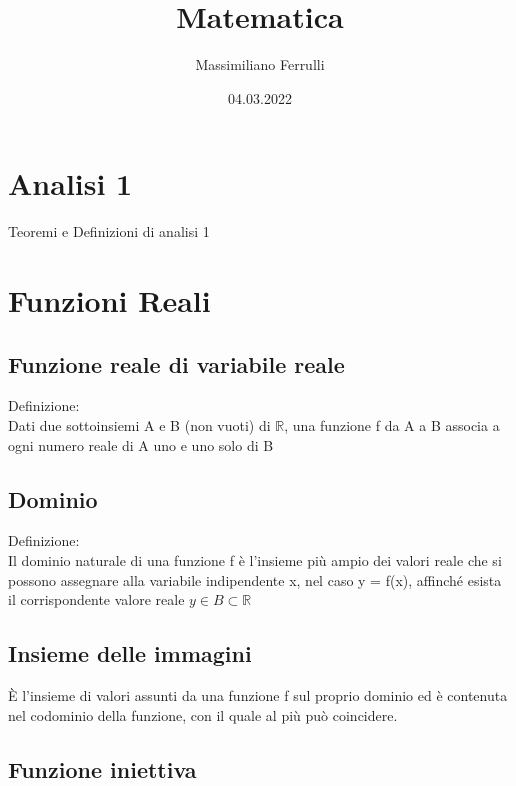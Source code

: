 \documentclass[a4paper,11pt]{article}
\begin{document}
\title{Matematica}

\author{Massimiliano Ferrulli}
\date{04.03.2022}



\maketitle

\section*{Analisi 1}
Teoremi e Definizioni di analisi 1

\pagebreak




\tableofcontents





\pagebreak



\section{Funzioni Reali}

\subsection{Funzione reale di variabile reale}
Definizione:
\\
Dati due sottoinsiemi A e B (non vuoti) di \( \mathbb{R}  \),  una funzione f da A a B associa a ogni numero reale di A uno e uno solo di B

\subsection{Dominio}
Definizione: 
\\
Il dominio naturale di una funzione f è l'insieme più ampio dei valori reale che si possono assegnare alla variabile indipendente x, nel caso y = f(x), affinché esista il corrispondente valore reale \( y \in B \subset \mathbb{R} \) \,

\subsection{Insieme delle immagini}
È l'insieme di valori assunti da una funzione f sul proprio dominio ed è contenuta nel codominio della funzione, con il quale al più può coincidere.

\subsection{Funzione iniettiva}
\end{document}
